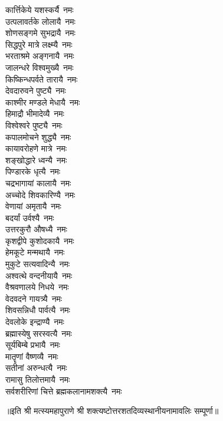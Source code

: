 \begin{multicols}{2}
\begin{flushleft}
कार्त्तिकेये यशस्कर्यै~नमः\\
उत्पलावर्तके लोलायै~नमः\\
शोणसङ्गमे सुभद्रायै~नमः\\
सिद्धपुरे मात्रे लक्ष्म्यै~नमः\\
भरताश्रमे अङ्गनायै~नमः\\
जालन्धरे विश्वमुख्यै~नमः\hfill{}\\
किष्किन्धपर्वते तारायै~नमः\\
देवदारुवने पुष्ट्यै~नमः\\
काश्मीर मण्डले मेधायै~नमः\\
हिमाद्रौ भीमादेव्यै~नमः\\
विश्वेश्वरे पुष्ट्यै~नमः\\
कपालमोचने शुद्ध्यै~नमः\\
कायावरोहणे मात्रे~नमः\\
शङ्खोद्धारे ध्वन्यै~नमः\\
पिण्डारके धृत्यै~नमः\\
चद्रभागायां कालायै~नमः\hfill{}\\
अच्चोदे शिवकारिण्यै~नमः\\
वेणायां अमृतायै~नमः\\
बदर्यां उर्वश्यै~नमः\\
उत्तरकुरौ औषध्यै~नमः\\
कृशद्वीपे कुशोदकायै~नमः\\
हेमकूटे मन्मथायै~नमः\\
मुकुटे सत्यवादिन्यै~नमः\\
अश्वत्थे वन्दनीयायै~नमः\\
वैश्रवणालये निधये~नमः\\
वेदवदने गायत्र्यै~नमः\hfill{}\\
शिवसन्निधौ पार्वत्यै~नमः\\
देवलोके इन्द्राण्यै~नमः\\
ब्रह्मास्येषु सरस्वत्यै~नमः\\
सूर्यबिम्बे प्रभायै~नमः\\
मातॄणां वैष्णव्यै~नमः\\
सतीनां अरुन्धत्यै~नमः\\
रामासु तिलोत्तमायै~नमः\\
सर्वशरीरिणां चित्ते ब्रह्मकलानामशक्त्यै~नमः\\
\end{flushleft}
\end{multicols}
॥इति श्री मत्स्यमहापुराणे श्री शक्त्यष्टोत्तर\-शतदिव्यस्थानीयनामावलिः सम्पूर्णा॥
